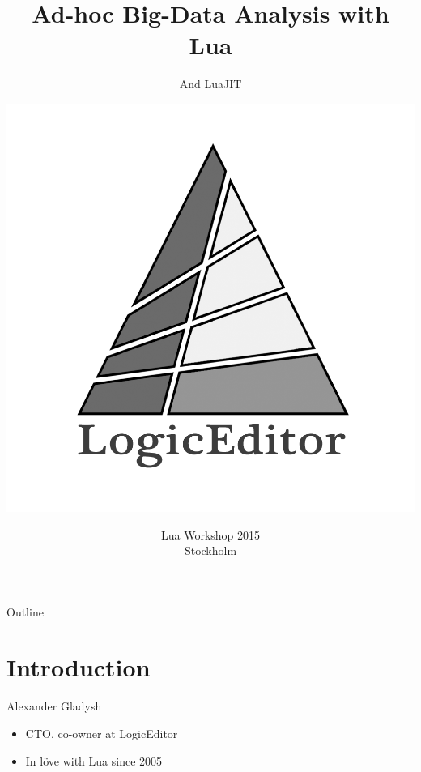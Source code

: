 \documentclass[handout]{beamer}
\title{Ad-hoc Big-Data Analysis with Lua}
\subtitle{And LuaJIT}
\author{\includegraphics[height=.4\textheight]{logo}}
\institute{Alexander Gladysh <ag@logiceditor.com>\newline@agladysh}
\date{Lua Workshop 2015\\Stockholm}
\newcommand{\comment}[1]{}
\begin{document}
\maketitle


\begin{frame}{Outline}

\tableofcontents

\end{frame}


\section{Introduction}


\begin{frame}{Alexander Gladysh}

\begin{itemize}
\item CTO, co-owner at LogicEditor
\item In löve with Lua since 2005
\end{itemize}

\end{frame}

\comment{
  Outline:

  1. Introduction
    Alexander Gladysh, CTO and co-owner of LogicEditor
  2. The elephant
    Define the problem. What is big data. Make small(er), more palatable, data
    from the big one. If you're big, you have hadoop and whatnot.
    If you're small, maybe you have google bigquery and analogs.

    But if you're small and have some modest computing power of your own
    and need to do some exploratory analysis, Lua to the rescue.
    As usual, go minimalistic then either pick existing tool you need
    or roll your own ecosystem.
    The workflow is to massage data and then feed it to more powerful analytics
    tool like R or even Excel.
  3. What hardware? Lots of memory, fast hdd / ssd,
  3. How data is stored.
    Files, synched across filesystems.
  4. Map-reduce, sort, join and friends (but you know them all)
    See also AA's ticket about combiners.
    Outline basic properties of the sorted data.
  5. The tools and the pipeline
    Some standard bash tools and LuaJIT (plain Lua would work too).
    Traditional alternatives to Lua: awk, perl are less maintainable for
    more complex scripts.
    There are always a few bash tools that you missed that could do the job
    better, faster etc. You can't know them all. I give you the basics.
  6. Sort
    + pre-sort stuff
    + join / sort -m, comm
    columns
  7. Uniq
  8. Grep
  9. cut, awk
  10. Lua.
    + memory limit
  11. Parallel
  12. Compression
    lxc for being fast
    pigz etc. for compatibility
    xz for size
  13. pv
    nifty diagnostics
  14. What's next?
    Hadoop
    FFI
  15. Questions?
}
\end{document}
